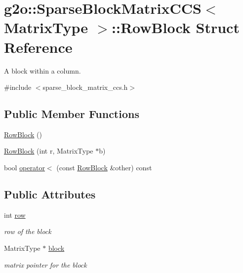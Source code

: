 \hypertarget{structg2o_1_1_sparse_block_matrix_c_c_s_1_1_row_block}{}\section{g2o\+:\+:Sparse\+Block\+Matrix\+C\+CS$<$ Matrix\+Type $>$\+:\+:Row\+Block Struct Reference}
\label{structg2o_1_1_sparse_block_matrix_c_c_s_1_1_row_block}


A block within a column.  




{\ttfamily \#include $<$sparse\+\_\+block\+\_\+matrix\+\_\+ccs.\+h$>$}

\subsection*{Public Member Functions}
\begin{DoxyCompactItemize}
\item 
\mbox{\hyperlink{structg2o_1_1_sparse_block_matrix_c_c_s_1_1_row_block_a0c9f288219a7fd8ad58c1dd2214734f5}{Row\+Block}} ()
\item 
\mbox{\hyperlink{structg2o_1_1_sparse_block_matrix_c_c_s_1_1_row_block_a78e2ec549fa14a225280b94022d05cea}{Row\+Block}} (int r, Matrix\+Type $\ast$b)
\item 
bool \mbox{\hyperlink{structg2o_1_1_sparse_block_matrix_c_c_s_1_1_row_block_aba437a681bd37d7320fc74e860ce2acf}{operator$<$}} (const \mbox{\hyperlink{structg2o_1_1_sparse_block_matrix_c_c_s_1_1_row_block}{Row\+Block}} \&other) const
\end{DoxyCompactItemize}
\subsection*{Public Attributes}
\begin{DoxyCompactItemize}
\item 
int \mbox{\hyperlink{structg2o_1_1_sparse_block_matrix_c_c_s_1_1_row_block_af414f235d5aa28ca1508cfa0860c4949}{row}}
\begin{DoxyCompactList}\small\item\em row of the block \end{DoxyCompactList}\item 
Matrix\+Type $\ast$ \mbox{\hyperlink{structg2o_1_1_sparse_block_matrix_c_c_s_1_1_row_block_a88ab75d0e29496d3ca023105256a2926}{block}}
\begin{DoxyCompactList}\small\item\em matrix pointer for the block \end{DoxyCompactList}\end{DoxyCompactItemize}


